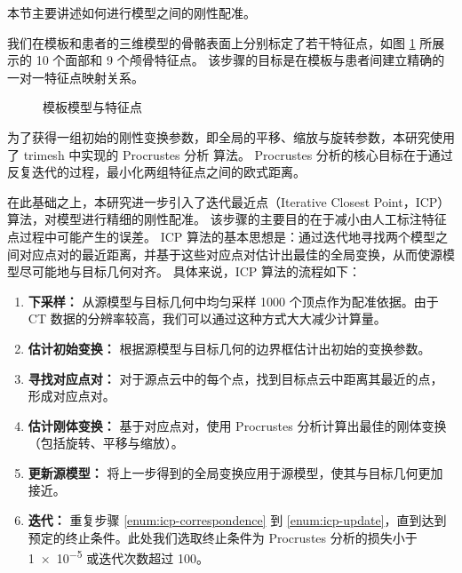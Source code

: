 本节主要讲述如何进行模型之间的刚性配准。

我们在模板和患者的三维模型的骨骼表面上分别标定了若干特征点，如图 \ref{fig:landmarks} 所展示的 10 个面部和 9 个颅骨特征点。
该步骤的目标是在模板与患者间建立精确的一对一特征点映射关系。

\begin{figure}
  \centering
   \quad
  \caption{模板模型与特征点}
  \label{fig:landmarks}
\end{figure}

为了获得一组初始的刚性变换参数，即全局的平移、缩放与旋转参数，本研究使用了 trimesh \cite{trimesh} 中实现的 Procrustes 分析 \cite{rossProcrustesAnalysis2004} 算法。
Procrustes 分析的核心目标在于通过反复迭代的过程，最小化两组特征点之间的欧式距离。

在此基础之上，本研究进一步引入了迭代最近点（Iterative Closest Point，ICP）算法，对模型进行精细的刚性配准。
该步骤的主要目的在于减小由人工标注特征点过程中可能产生的误差。
ICP 算法的基本思想是：通过迭代地寻找两个模型之间对应点对的最近距离，并基于这些对应点对估计出最佳的全局变换，从而使源模型尽可能地与目标几何对齐。
具体来说，ICP 算法的流程如下：
\begin{enumerate}
  \item \textbf{下采样：} 从源模型与目标几何中均匀采样 \num{1000} 个顶点作为配准依据。由于 CT 数据的分辨率较高，我们可以通过这种方式大大减少计算量。
  \item \textbf{估计初始变换：} 根据源模型与目标几何的边界框估计出初始的变换参数。
  \item \label{enum:icp-correspondence} \textbf{寻找对应点对：} 对于源点云中的每个点，找到目标点云中距离其最近的点，形成对应点对。
  \item \textbf{估计刚体变换：} 基于对应点对，使用 Procrustes 分析计算出最佳的刚体变换（包括旋转、平移与缩放）。
  \item \label{enum:icp-update} \textbf{更新源模型：} 将上一步得到的全局变换应用于源模型，使其与目标几何更加接近。
  \item \textbf{迭代：} 重复步骤 \ref{enum:icp-correspondence} 到 \ref{enum:icp-update}，直到达到预定的终止条件。此处我们选取终止条件为 Procrustes 分析的损失小于 \num{1e-5} 或迭代次数超过 \num{100}。
\end{enumerate}

